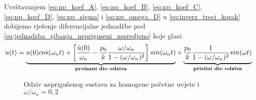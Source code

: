 Uvrštavanjem \eqref{eq:np_koef_A}, \eqref{eq:np_koef_B}, \eqref{eq:np_koef_C},
\eqref{eq:np_koef_D}, \eqref{eq:np_sigma} i \eqref{eq:np_omega_D} u  \eqref{eq:inverz_treci_korak}
dobijemo rješenje diferencijalne jednadžbe pod
\eqref{eq:jednadzba_gibanja_nepriguseni_nesredjeno} 
koje glasi:
\begin{equation}
	u(t)=\underbrace{
            u(0)cos(\omega_n t)
            +
	\left[
            \frac{\dot{u}(0)}{\omega_n}-\frac{p_0}{k}\frac{\omega/\omega_n}{1-(\omega/\omega_n)^2}
        \right]sin(\omega_n t)\\
	}_{\text{\textbf{prolazni dio odziva}}}
        +
	\underbrace{
            \frac{p_0}{k}\frac{1}{1-(\omega/\omega_n)^2} sin(\omega t)
	}_{\text{\textbf{prisilni dio odziva}}}
\end{equation}

\begin{figure}[H]
    
    \label{fig:odziv-nepriguseno}
    \caption{Odziv neprigušenog sustava za homogene početne uvjete i
    $\omega/\omega_n=0,2$}
\end{figure}
\newpage


